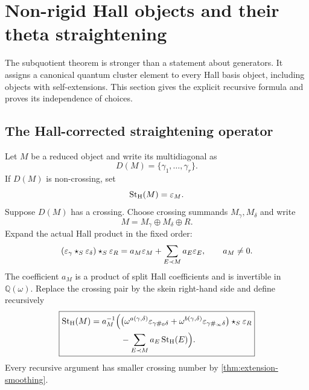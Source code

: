 \section{Non-rigid Hall objects and their theta straightening}
\label{sec:nonrigid}

The subquotient theorem is stronger than a statement about generators.  It
assigns a canonical quantum cluster element to every Hall basis object,
including objects with self-extensions.  This section gives the explicit
recursive formula and proves its independence of choices.

\subsection{The Hall-corrected straightening operator}

Let $M$ be a reduced object and write its multidiagonal as
\[
 D(M)=\{\gamma_1,\ldots,\gamma_r\}.
\]
If $D(M)$ is non-crossing, set
\begin{equation}
 \operatorname{St}_{\mathrm H}(M)=\varepsilon_M.
 \label{eq:straightening-rigid-base}
\end{equation}
Suppose $D(M)$ has a crossing.  Choose crossing summands
$M_\gamma,M_\delta$ and write
\[
 M=M_\gamma\oplus M_\delta\oplus R.
\]
Expand the actual Hall product in the fixed order:
\begin{equation}
 (\varepsilon_\gamma\star_S\varepsilon_\delta)\star_S\varepsilon_R
 =a_M\varepsilon_M+
  \sum_{E\prec M}a_E\varepsilon_E,
 \qquad a_M\ne0.
 \label{eq:Hall-product-containing-M}
\end{equation}
The coefficient $a_M$ is a product of split Hall coefficients and is
invertible in $\mathbb Q(\omega)$.  Replace the crossing pair by the skein
right-hand side and define recursively
\begin{equation}
\boxed{
\begin{aligned}
 \operatorname{St}_{\mathrm H}(M)=a_M^{-1}\Big(&
 \big(
   \omega^{a(\gamma,\delta)}
      \varepsilon_{\gamma\#_0\delta}
  +\omega^{b(\gamma,\delta)}
      \varepsilon_{\gamma\#_\infty\delta}
 \big)\star_S\varepsilon_R\\
 &-\sum_{E\prec M}a_E\operatorname{St}_{\mathrm H}(E)
 \Big).
\end{aligned}}
\label{eq:Hall-corrected-straightening}
\end{equation}
Every recursive argument has smaller crossing number by
\cref{thm:extension-smoothing}.

